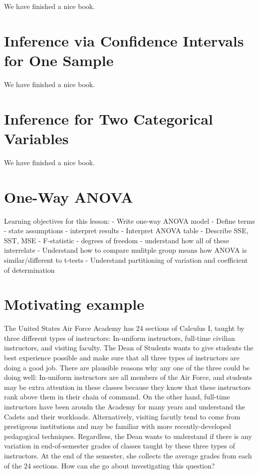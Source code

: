 \documentclass[]{book}
\theoremstyle{definition}
\theoremstyle{definition}
\theoremstyle{definition}
\theoremstyle{remark}
\begin{document}
We have finished a nice book.

\chapter{Inference via Confidence Intervals for One Sample}\label{CI}

We have finished a nice book.

\chapter{Inference for Two Categorical Variables}\label{twocategorical}

We have finished a nice book.

\chapter{One-Way ANOVA}\label{anova}

Learning objectives for this lesson: - Write one-way ANOVA model -
Define terms - state assumptions - interpret results - Interpret ANOVA
table - Describe SSE, SST, MSE - F-statistic - degrees of freedom -
understand how all of these interrelate - Understand how to compare
mulitple group means how ANOVA is similar/different to t-tests -
Understand partitioning of variation and coefficient of determination

\chapter{Motivating example}\label{motivating-example}

The United States Air Force Academy has 24 sections of Calculus I,
taught by three different types of instructors: In-uniform instructors,
full-time civilian instructors, and visiting faculty. The Dean of
Students wants to give students the best experience possible and make
sure that all three types of instructors are doing a good job. There are
plausible reasons why any one of the three could be doing well:
In-uniform instructors are all members of the Air Force, and students
may be extra attention in these classes because they know that these
instructors rank above them in their chain of command. On the other
hand, full-time instructors have been aroudn the Academy for many years
and understand the Cadets and their workloads. Alternatively, visiting
facutly tend to come from prestigeous institutions and may be familiar
with more recently-developed pedagogical techniques. Regardless, the
Dean wants to understand if there is any variation in end-of-semester
grades of classes taught by these three types of instructors. At the end
of the semester, she collects the average grades from each of the 24
sections. How can she go about investigating this question?
\end{document}
